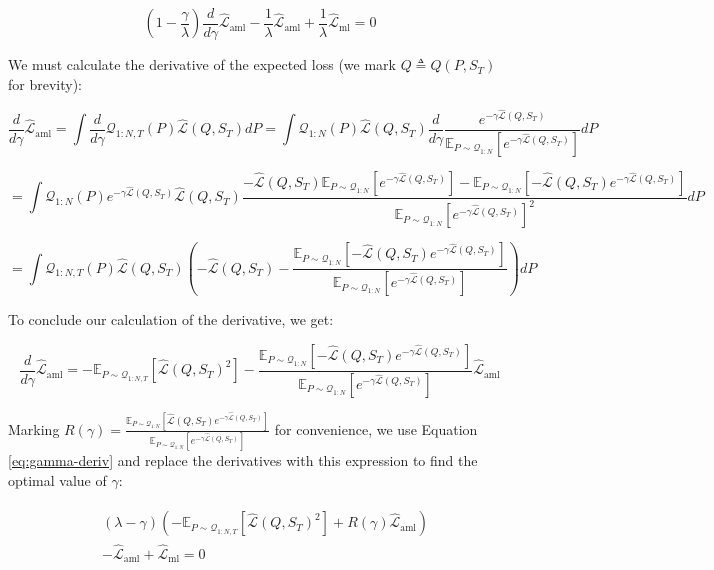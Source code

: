 \documentclass{article}
\theoremstyle{definition}
\newcommand{\Expect}[2]{\mathbb{E}_{#1}\left [#2 \right ]}
\begin{document}
\begin{equation} \label{eq:gamma-deriv}
(1-\frac{\gamma}{\lambda})\frac{d}{d\gamma}\hat{\mathcal{L}}_{\mathrm{aml}} -\frac{1}{\lambda}\hat{\mathcal{L}}_{\mathrm{aml}} +\frac{1}{\lambda}\hat{\mathcal{L}}_{\mathrm{ml}} =0
\end{equation}

We must calculate the derivative of the expected loss (we mark $Q\triangleq Q(P,S_T)$ for brevity): 

$$\frac{d}{d\gamma}\hat{\mathcal{L}}_{\mathrm{aml}}=\int \frac{d}{d\gamma}\mathcal{Q}_{1:N,T}(P)\hat{\mathcal{L}}(Q, S_T)dP=\int \mathcal{Q}_{1:N}(P)\hat{\mathcal{L}}(Q, S_T)\frac{d}{d\gamma}
\frac{e^{-\gamma\hat{\mathcal{L}}(Q,S_T)}}{\Expect{P\sim \mathcal{Q}_{1:N}}{e^{-\gamma\hat{\mathcal{L}}(Q,S_T)}}}dP$$

$$=\int \mathcal{Q}_{1:N}(P)e^{-\gamma\hat{\mathcal{L}}(Q,S_T)}\hat{\mathcal{L}}(Q, S_T)\frac{-\hat{\mathcal{L}}(Q,S_T)\Expect{P\sim \mathcal{Q}_{1:N}}{e^{-\gamma\hat{\mathcal{L}}(Q,S_T)}}
	-\Expect{P\sim \mathcal{Q}_{1:N}}{-\hat{\mathcal{L}}(Q,S_T)e^{-\gamma\hat{\mathcal{L}}(Q,S_T)} }}{\Expect{P\sim \mathcal{Q}_{1:N}}{e^{-\gamma\hat{\mathcal{L}}(Q,S_T)}}^2}dP$$


$$=\int \mathcal{Q}_{1:N,T}(P)\hat{\mathcal{L}}(Q, S_T)\left (-\hat{\mathcal{L}}(Q,S_T)-
\frac{\Expect{P\sim \mathcal{Q}_{1:N}}{-\hat{\mathcal{L}}(Q,S_T)e^{-\gamma\hat{\mathcal{L}}(Q,S_T)} }}{\Expect{P\sim \mathcal{Q}_{1:N}}{e^{-\gamma\hat{\mathcal{L}}(Q,S_T)}}}\right)dP$$

To conclude our calculation of the derivative, we get:

$$\frac{d}{d\gamma}\hat{\mathcal{L}}_{\mathrm{aml}}=-\Expect{P\sim \mathcal{Q}_{1:N,T}}{\hat{\mathcal{L}}(Q,S_T)^2}-\frac{\Expect{P\sim \mathcal{Q}_{1:N}}{-\hat{\mathcal{L}}(Q,S_T)e^{-\gamma\hat{\mathcal{L}}(Q,S_T)} }}{\Expect{P\sim \mathcal{Q}_{1:N}}{e^{-\gamma\hat{\mathcal{L}}(Q,S_T)}} }\hat{\mathcal{L}}_{\mathrm{aml}} $$

Marking $R(\gamma)=\frac{\Expect{P\sim \mathcal{Q}_{1:N}}{\hat{\mathcal{L}}(Q,S_T)e^{-\gamma\hat{\mathcal{L}}(Q,S_T)} }}{\Expect{P\sim \mathcal{Q}_{1:N}}{e^{-\gamma\hat{\mathcal{L}}(Q,S_T)}} }$ for convenience, we use Equation \ref{eq:gamma-deriv} and replace the derivatives with this expression to find the optimal value of $\gamma$: 

\begin{align*} 
\begin{split}
&(\lambda-\gamma)\left (-\Expect{P\sim \mathcal{Q}_{1:N,T}}{\hat{\mathcal{L}}(Q,S_T)^2}+R(\gamma)\hat{\mathcal{L}}_{\mathrm{aml}}\right )\\& - \hat{\mathcal{L}}_{\mathrm{aml}}+\hat{\mathcal{L}}_{\mathrm{ml}} = 0
\end{split}
\end{align*}
\end{document}
